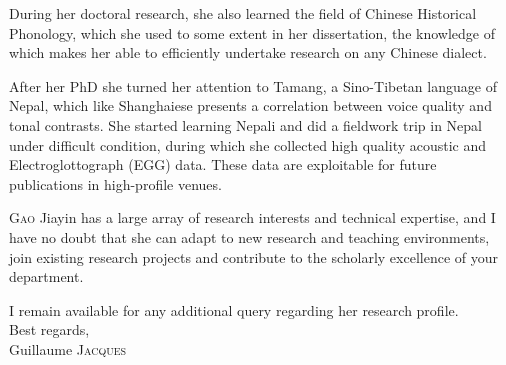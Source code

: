 \documentclass[oldfontcommands,oneside,a4paper,11pt]{article}
\begin{document}
During her doctoral research, she also learned the field of Chinese Historical Phonology, which she used to some extent in her dissertation, the knowledge of which makes her able to efficiently undertake research on any Chinese dialect.

After her PhD she turned her attention to Tamang, a Sino-Tibetan language of Nepal, which like Shanghaiese presents a correlation between voice quality and tonal contrasts. She started learning Nepali and did a fieldwork trip in Nepal under difficult condition, during which she collected high quality acoustic and Electroglottograph (EGG) data. These data are exploitable for future publications in high-profile venues.

\textsc{Gao} Jiayin has a large array of research interests and technical expertise,  and I have no doubt that she can adapt to new research and teaching environments, join existing research projects and contribute to the scholarly excellence of your department.

I remain available for any additional query regarding her research profile.\\

Best regards,\\

Guillaume \textsc{Jacques}
\end{document}
